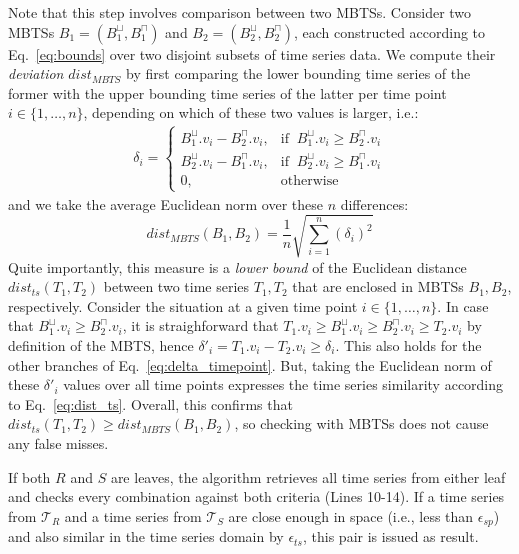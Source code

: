 Note that this step involves comparison between two MBTSs. Consider two MBTSs $B_1 = (B_1^{\sqcup}, B_1^{\sqcap})$ and $B_2 = (B_2^{\sqcup}, B_2^{\sqcap})$, each constructed according to Eq.~\ref{eq:bounds} over two disjoint subsets of time series data. We compute their {\em deviation} $dist_{MBTS}$ by first comparing the lower bounding time series of the former with the upper bounding time series of the latter per time point $i \in \{ 1, \dots, n \}$, depending on which of these two values is larger, i.e.:
\begin{equation}
 \begin{split}
  \delta_i = \begin{cases}
  B_1^{\sqcup}.v_i - B_2^{\sqcap}.v_i, & \text{if} \;\; B_1^{\sqcup}.v_i \geq B_2^{\sqcap}.v_i \\
  B_2^{\sqcup}.v_i - B_1^{\sqcap}.v_i, & \text{if} \;\; B_2^{\sqcup}.v_i \geq B_1^{\sqcap}.v_i \\
  0, & \text{otherwise}
    \end{cases}
 \end{split}
 \label{eq:delta_timepoint}
\end{equation}
\noindent and we take the average Euclidean norm over these $n$ differences:
\begin{equation} \label{eq:dist_mbts}
dist_{MBTS}(B_1, B_2) = \frac{1}{n}\sqrt{\displaystyle \sum_{i=1}^{n}({\delta}_i)^2}
\end{equation}
Quite importantly, this measure is a {\em lower bound} of the Euclidean distance $dist_{ts}(T_1, T_2)$  between two time series $T_1, T_2$ that are enclosed in MBTSs $B_1, B_2$, respectively. Consider the situation at a given time point $i \in \{ 1, \dots, n \}$. In case that $B_1^{\sqcup}.v_i \geq B_2^{\sqcap}.v_i$, it is straighforward that $T_1.v_i \geq B_1^{\sqcup}.v_i \geq B_2^{\sqcap}.v_i \geq T_2.v_i$ by definition of the MBTS, hence ${\delta}'_i = T_1.v_i - T_2.v_i \geq {\delta}_i$. This also holds for the other branches of Eq.~\ref{eq:delta_timepoint}. But, taking the Euclidean norm of these ${\delta}'_i$ values over all time points expresses the time series similarity according to Eq.~\ref{eq:dist_ts}. Overall, this confirms that $dist_{ts}(T_1, T_2) \geq dist_{MBTS}(B_1, B_2)$, so checking with MBTSs does not cause any false misses.
   
If both $R$ and $S$ are leaves, the algorithm retrieves all time series from either leaf and checks every combination against both criteria (Lines 10-14). If a time series from $\mathcal{T}_{R}$ and a time series from $\mathcal{T}_{S}$ are close enough in space (i.e., less than $\epsilon_{sp}$) and also similar in the time series domain by $\epsilon_{ts}$, this pair is issued as result.

